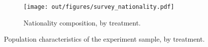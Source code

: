 \documentclass[12pt]{article}
\begin{document}
\begin{figure}
    \ContinuedFloat
    \centering
    \begin{subfigure}[b]{\textwidth}
        \centering
        \texttt{[image: out/figures/survey\_nationality.pdf]}
        \caption{Nationality composition, by treatment.}
        \label{fig:survey_nationality}
    \end{subfigure}
    \caption{Population characteristics of the experiment sample, by treatment.}
    \label{fig:balance_cont}
\end{figure}
\end{document}
